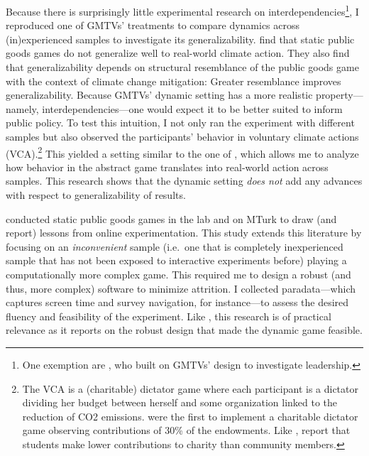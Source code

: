 \documentclass[
  authoryear,
  review,
  3p,
  onecolumn]{elsarticle}
\begin{document}
Because there is surprisingly little experimental research on
interdependencies\footnote{One exemption are \citet{Moser2019}, who
  built on GMTVs' design to investigate leadership.}, I reproduced one
of GMTVs' treatments to compare dynamics across (in)experienced samples
to investigate its generalizability. \citet{GKLS2020} find that static
public goods games do not generalize well to real-world climate action.
They also find that generalizability depends on structural resemblance
of the public goods game with the context of climate change mitigation:
Greater resemblance improves generalizability. Because GMTVs' dynamic
setting has a more realistic property---namely, interdependencies---one
would expect it to be better suited to inform public policy. To test
this intuition, I not only ran the experiment with different samples but
also observed the participants' behavior in voluntary climate actions
(VCA).\footnote{The VCA is a (charitable) dictator game where each
  participant is a dictator dividing her budget between herself and some
  organization linked to the reduction of CO2 emissions.
  \citet{EckelGrossman1996} were the first to implement a charitable
  dictator game observing contributions of 30\% of the endowments. Like
  \citet{GKLS2020}, \citet{CarpenterEtAl2008} report that students make
  lower contributions to charity than community members.} This yielded a
setting similar to the one of \citet{GKLS2020}, which allows me to
analyze how behavior in the abstract game translates into real-world
action across samples. This research shows that the dynamic setting
\emph{does not} add any advances with respect to generalizability of
results.

\citet{AGM2018} conducted static public goods games in the lab and on
MTurk to draw (and report) lessons from online experimentation. This
study extends this literature \citep[see,
e.g.,][]{SnowbergYariv_2021, GuptaRigottiWilson_2021, GoodmanPaolacci2017, AmirEtAl2012}
by focusing on an \emph{inconvenient} sample (i.e.~one that is
completely inexperienced sample that has not been exposed to interactive
experiments before) playing a computationally more complex game. This
required me to design a robust (and thus, more complex) software to
minimize attrition. I collected paradata---which captures screen time
and survey navigation, for instance---to assess the desired fluency and
feasibility of the experiment. Like \citet{AGM2018}, this research is of
practical relevance as it reports on the robust design that made the
dynamic game feasible.
\end{document}
